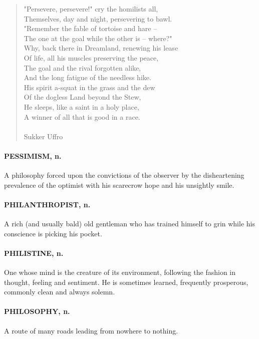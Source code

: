\documentclass[11pt]{article}
\begin{document}
\begin{quote}   "Persevere, persevere!" cry the homilists all, \\
  Themselves, day and night, persevering to bawl. \\
  "Remember the fable of tortoise and hare -- \\
  The one at the goal while the other is -- where?" \\
  Why, back there in Dreamland, renewing his lease \\
  Of life, all his muscles preserving the peace, \\
  The goal and the rival forgotten alike, \\
  And the long fatigue of the needless hike. \\
  His spirit a-squat in the grass and the dew \\
  Of the dogless Land beyond the Stew, \\
  He sleeps, like a saint in a holy place, \\
  A winner of all that is good in a race. \\
 \\
Sukker Uffro \end{quote}


\paragraph{PESSIMISM, n.}  A philosophy forced upon the convictions of the
observer by the disheartening prevalence of the optimist with his
scarecrow hope and his unsightly smile.

\paragraph{PHILANTHROPIST, n.}  A rich (and usually bald) old gentleman who has
trained himself to grin while his conscience is picking his pocket.

\paragraph{PHILISTINE, n.}  One whose mind is the creature of its environment,
following the fashion in thought, feeling and sentiment.  He is
sometimes learned, frequently prosperous, commonly clean and always
solemn.

\paragraph{PHILOSOPHY, n.}  A route of many roads leading from nowhere to nothing.
\end{document}
